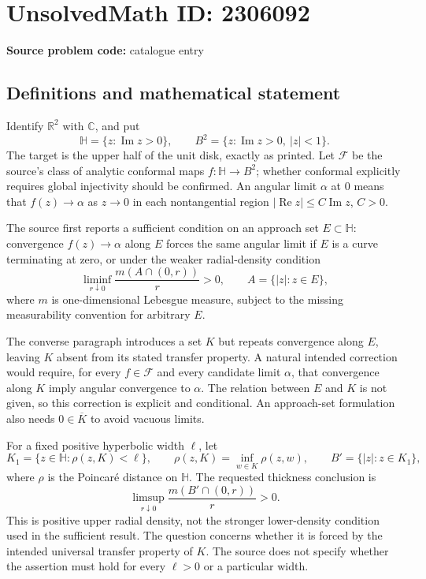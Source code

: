 \documentclass[11pt]{article}
\newcommand{\R}{\mathbb{R}}
\newcommand{\C}{\mathbb{C}}
\begin{document}
\section*{UnsolvedMath ID: 2306092}
\textbf{Source problem code:} catalogue entry
\subsection{Definitions and mathematical statement}
Identify $\R^2$ with $\C$, and put
\[
\mathbb H=\{z:\operatorname{Im}z>0\},\qquad
B^2=\{z:\operatorname{Im}z>0,\ |z|<1\}.
\]
The target is the upper half of the unit disk, exactly as printed. Let $\mathcal F$ be the source's class of analytic conformal maps $f:\mathbb H\to B^2$; whether conformal explicitly requires global injectivity should be confirmed. An angular limit $\alpha$ at $0$ means that $f(z)\to\alpha$ as $z\to0$ in each nontangential region $|\operatorname{Re}z|\le C\operatorname{Im}z$, $C>0$.

The source first reports a sufficient condition on an approach set $E\subset\mathbb H$: convergence $f(z)\to\alpha$ along $E$ forces the same angular limit if $E$ is a curve terminating at zero, or under the weaker radial-density condition
\[
\liminf_{r\downarrow0}\frac{m(A\cap(0,r))}{r}>0,
\qquad A=\{|z|:z\in E\},
\]
where $m$ is one-dimensional Lebesgue measure, subject to the missing measurability convention for arbitrary $E$.

The converse paragraph introduces a set $K$ but repeats convergence along $E$, leaving $K$ absent from its stated transfer property. A natural intended correction would require, for every $f\in\mathcal F$ and every candidate limit $\alpha$, that convergence along $K$ imply angular convergence to $\alpha$. The relation between $E$ and $K$ is not given, so this correction is explicit and conditional. An approach-set formulation also needs $0\in\overline K$ to avoid vacuous limits.

For a fixed positive hyperbolic width $\ell$, let
\[
K_1=\{z\in\mathbb H:\rho(z,K)<\ell\},\qquad
\rho(z,K)=\inf_{w\in K}\rho(z,w),\qquad
B'=\{|z|:z\in K_1\},
\]
where $\rho$ is the Poincar\'e distance on $\mathbb H$. The requested thickness conclusion is
\[
\limsup_{r\downarrow0}\frac{m(B'\cap(0,r))}{r}>0.
\]
This is positive upper radial density, not the stronger lower-density condition used in the sufficient result. The question concerns whether it is forced by the intended universal transfer property of $K$. The source does not specify whether the assertion must hold for every $\ell>0$ or a particular width.
\end{document}
